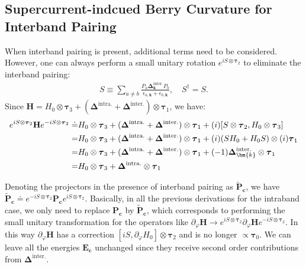 \begin{subappendices}
\section{Supercurrent-indcued Berry Curvature for Interband Pairing}
When interband pairing is present, additional terms need to be considered. However, one can always perform a small unitary rotation $e^{iS\otimes\boldsymbol\tau_2}$ to eliminate the interband pairing:
\begin{align}
	S\equiv \sum_{a\neq b}\frac{P_a\boldsymbol \Delta^{\text{inter.}}_{\bm{k}} P_b}{\epsilon_{a,\bm{k}}+\epsilon_{b,\bm{k}}}, \quad S^\dagger=S.
\end{align}
Since $\mathbf H = H_0\otimes\boldsymbol\tau_3+ (\boldsymbol \Delta^{\text{intra.}}+\boldsymbol\Delta^{\text{inter.}})\otimes \boldsymbol \tau_1$, we have:
\begin{align}
	e^{iS\otimes\boldsymbol\tau_2}\mathbf H e^{-iS\otimes\boldsymbol\tau_2}\doteq & H_0\otimes\boldsymbol\tau_3+(\boldsymbol \Delta^{\text{intra.}}+\boldsymbol\Delta^{\text{inter.}})\otimes \boldsymbol \tau_1+(i)[S\otimes\boldsymbol\tau_2,H_0\otimes\boldsymbol\tau_3]\notag\\
	=& H_0\otimes\boldsymbol\tau_3+(\boldsymbol \Delta^{\text{intra.}}+\boldsymbol\Delta^{\text{inter.}})\otimes \boldsymbol \tau_1+(i) (SH_0+H_0S)\otimes (i)\boldsymbol\tau_1\notag\\
	=&H_0\otimes\boldsymbol\tau_3+(\boldsymbol \Delta^{\text{intra.}}+\boldsymbol\Delta^{\text{inter.}})\otimes \boldsymbol \tau_1+(-1) \boldsymbol\Delta^{\text{inter.}}_{\bm{k}}\otimes \boldsymbol\tau_1\notag\\
    =&H_0\otimes\boldsymbol\tau_3+\boldsymbol \Delta^{\text{intra.}}\otimes \boldsymbol \tau_1
\end{align}

Denoting the projectors in the presence of interband pairing as $\widetilde {\mathbf P}_{\mathbf c}$, we have $\widetilde {\mathbf P}_{\mathbf c}\doteq e^{-i S\otimes\boldsymbol\tau_2}\mathbf P_{\mathbf c}e^{i S\otimes\boldsymbol\tau_2}$. Basically, in all the previous derivations for the intraband case, we only need to replace $\mathbf P_{\mathbf c}$ by $\widetilde {\mathbf P}_{\mathbf c}$, which corresponds to performing the small unitary transformation for the operators like $\partial_\varphi\mathbf H\rightarrow e^{i S\otimes\boldsymbol\tau_2}\partial_\varphi\mathbf H e^{-i S\otimes\boldsymbol\tau_2}$. In this way $\partial_\varphi \mathbf H$ has a correction $[i S, \partial_\varphi H_0]\otimes\boldsymbol\tau_2$ and is no longer $\propto \boldsymbol\tau_0$. We can leave all the energies $\mathbf E_{\mathbf c}$ unchanged since they receive second order contributions from $\boldsymbol\Delta^{\text{inter.}}$.


\end{subappendices}
